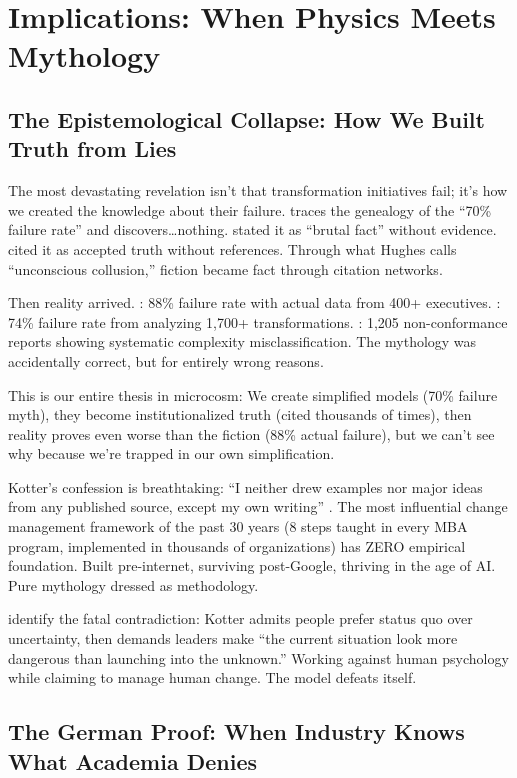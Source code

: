 \section{Implications: When Physics Meets Mythology}

\subsection{The Epistemological Collapse: How We Built Truth from Lies}

The most devastating revelation isn't that transformation initiatives fail; it's how we created the knowledge about their failure. \citet{hughes2011} traces the genealogy of the ``70\% failure rate'' and discovers\ldots nothing. \citet{beer2000} stated it as ``brutal fact'' without evidence. \citet{kotter2008} cited it as accepted truth without references. Through what Hughes calls ``unconscious collusion,'' fiction became fact through citation networks.

Then reality arrived. \citet{bain2024}: 88\% failure rate with actual data from 400+ executives. \citet{bcg2024}: 74\% failure rate from analyzing 1,700+ transformations. \citet{ford2024}: 1,205 non-conformance reports showing systematic complexity misclassification. The mythology was accidentally correct, but for entirely wrong reasons.

This is our entire thesis in microcosm: We create simplified models (70\% failure myth), they become institutionalized truth (cited thousands of times), then reality proves even worse than the fiction (88\% actual failure), but we can't see why because we're trapped in our own simplification.

Kotter's confession is breathtaking: ``I neither drew examples nor major ideas from any published source, except my own writing'' \citep{hughes2015}. The most influential change management framework of the past 30 years (8 steps taught in every MBA program, implemented in thousands of organizations) has ZERO empirical foundation. Built pre-internet, surviving post-Google, thriving in the age of AI. Pure mythology dressed as methodology.

\citet{mclaren2023} identify the fatal contradiction: Kotter admits people prefer status quo over uncertainty, then demands leaders make ``the current situation look more dangerous than launching into the unknown.'' Working against human psychology while claiming to manage human change. The model defeats itself.

\subsection{The German Proof: When Industry Knows What Academia Denies}

